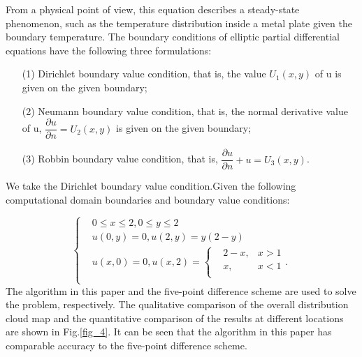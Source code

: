 \documentclass[10pt,journal,compsoc]{IEEEtran}
\begin{document}
From a physical point of view, this equation describes a steady-state phenomenon, such as the temperature distribution inside a metal plate given the boundary temperature. The boundary conditions of elliptic partial differential equations have the following three formulations: 
\begin{enumerate}
\item[(1)] Dirichlet boundary value condition, that is, the value $U_{1}(x,y)$ of u is given on the given boundary; 
\item[(2)] Neumann boundary value condition, that is, the normal derivative value of u, $\dfrac{\partial u}{\partial n} = U_{2}(x,y)$ is given on the given boundary;
\item[(3)] Robbin boundary value condition, that is, $\dfrac{\partial u}{\partial n} + u = U_{3}(x,y)$.
\end{enumerate}
We take the Dirichlet boundary value condition.Given the following computational domain boundaries and boundary value conditions:


\begin{equation}
\left\{
\begin{aligned}
& 0 \leq x \leq 2,0 \leq y \leq 2 \\
&u(0,y) = 0,u(2,y) = y(2-y) \\
&u(x,0) = 0,u(x,2) = \left\{ 
\begin{aligned}
&2-x,&x > 1\\
&x,&x<1 \\
\end{aligned} 
.\right. \\
\end{aligned}
\right.
\label{equ_16}
\end{equation}
The algorithm in this paper and the five-point difference scheme are used to solve the problem, respectively. The qualitative comparison of the overall distribution cloud map and the quantitative comparison of the results at different locations are shown in Fig.\ref{fig_4}. It can be seen that the algorithm in this paper has comparable accuracy to the five-point difference scheme.
\end{document}
